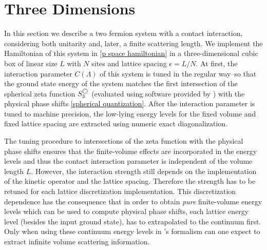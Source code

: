 \section{Three Dimensions}\label{sec:3D}

In this section we describe a two fermion system with a contact interaction, considering both unitarity and, later, a finite scattering length.
We implement the Hamiltonian of this system in \eqref{p space hamiltonian} in a three-dimensional cubic box of linear size $L$ with $N$ sites and lattice spacing $\epsilon=L/N$.
At first, the interaction parameter $C(\Lambda)$ of this system is tuned in the regular way--so that the ground state energy of the system matches the first intersection of the spherical zeta function $S^{\bigcirc}_3$ (evaluated using software provided by ) with the physical phase shifts \eqref{spherical quantization}.
After the interaction parameter is tuned to machine precision, the low-lying energy levels for the fixed volume and fixed lattice spacing are extracted using numeric exact diagonalization.

The tuning procedure to intersections of the zeta function with the physical phase shifts ensures that the finite-volume effects are incorporated in the energy levels and thus the contact interaction parameter is independent of the volume length $L$.
However, the interaction strength still depends on the implementation of the kinetic operator and the lattice spacing.
Therefore the strength has to be retuned for each lattice discretization implementation.
This discretization dependence has the consequence that in order to obtain \textit{pure} finite-volume energy levels which can be used to compute physical phase shifts, each lattice energy level (besides the input ground state), has to extrapolated to the continuum first.
Only when using these continuum energy levels in \Luscher's formalism can one expect to extract infinite volume scattering information.

